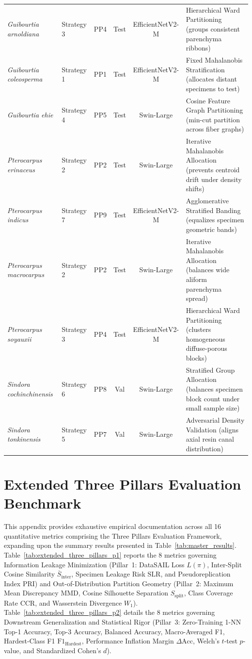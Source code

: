 \documentclass[a4paper,fleqn]{cas-sc}
\begin{document}
\begin{table}[pos=htbp]
{\begin{tabular}{lllccl}
\textit{Guibourtia arnoldiana} & Strategy 3 & PP4 & Test & EfficientNetV2-M & Hierarchical Ward Partitioning (groups consistent parenchyma ribbons) \\
\textit{Guibourtia coleosperma} & Strategy 1 & PP1 & Test & EfficientNetV2-M & Fixed Mahalanobis Stratification (allocates distant specimens to test) \\
\textit{Guibourtia ehie} & Strategy 4 & PP5 & Test & Swin-Large & Cosine Feature Graph Partitioning (min-cut partition across fiber graphs) \\
\textit{Pterocarpus erinaceus} & Strategy 2 & PP2 & Test & Swin-Large & Iterative Mahalanobis Allocation (prevents centroid drift under density shifts) \\
\textit{Pterocarpus indicus} & Strategy 7 & PP9 & Test & EfficientNetV2-M & Agglomerative Stratified Banding (equalizes specimen geometric bands) \\
\textit{Pterocarpus macrocarpus} & Strategy 2 & PP2 & Test & Swin-Large & Iterative Mahalanobis Allocation (balances wide aliform parenchyma spread) \\
\textit{Pterocarpus soyauxii} & Strategy 3 & PP4 & Test & EfficientNetV2-M & Hierarchical Ward Partitioning (clusters homogeneous diffuse-porous blocks) \\
\textit{Sindora cochinchinensis} & Strategy 6 & PP8 & Val & Swin-Large & Stratified Group Allocation (balances specimen block count under small sample size) \\
\textit{Sindora tonkinensis} & Strategy 5 & PP7 & Val & Swin-Large & Adversarial Density Validation (aligns axial resin canal distribution) \\
\bottomrule
\end{tabular}%
}
\end{table}

\section{Extended Three Pillars Evaluation Benchmark}
\label{app:extended_benchmark}

This appendix provides exhaustive empirical documentation across all 16 quantitative metrics comprising the Three Pillars Evaluation Framework, expanding upon the summary results presented in Table~\ref{tab:master_results}. Table~\ref{tab:extended_three_pillars_p1} reports the 8 metrics governing Information Leakage Minimization (Pillar~1: DataSAIL Loss $L(\pi)$, Inter-Split Cosine Similarity $\bar{S}_{\text{inter}}$, Specimen Leakage Risk $\mathrm{SLR}$, and Pseudoreplication Index $\mathrm{PRI}$) and Out-of-Distribution Partition Geometry (Pillar~2: Maximum Mean Discrepancy $\mathrm{MMD}$, Cosine Silhouette Separation $S_{\text{split}}$, Class Coverage Rate $\mathrm{CCR}$, and Wasserstein Divergence $W_1$). Table~\ref{tab:extended_three_pillars_p2} details the 8 metrics governing Downstream Generalization and Statistical Rigor (Pillar~3: Zero-Training 1-NN Top-1 Accuracy, Top-3 Accuracy, Balanced Accuracy, Macro-Averaged F1, Hardest-Class F1 $\mathrm{F1}_{\text{Hardest}}$, Performance Inflation Margin $\Delta\text{Acc}$, Welch's $t$-test $p$-value, and Standardized Cohen's $d$).
\end{document}

